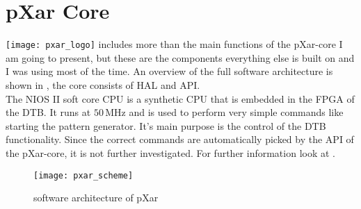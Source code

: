 \section{pXar Core}
\texttt{[image: pxar\_logo]}
includes more than the main functions of the pXar-core I am going to present, but these are the components everything else is built on and I was using most of the time. An overview of the full software architecture is shown in , the core consists of \ac{HAL} and \ac{API}.\\
The NIOS II soft core \ac{CPU} is a synthetic \ac{CPU} that is embedded in the \ac{FPGA} of the \ac{DTB}. It runs at $50\,$MHz and is used to perform very simple commands like starting the pattern generator. It's main purpose is the control of the \ac{DTB} functionality. Since the correct commands are automatically picked by the \ac{API} of the pXar-core, it is not further investigated. For further information look at \cite{spannagel}.
\begin{figure}[ht]
	\texttt{[image: pxar\_scheme]}
	\caption{software architecture of pXar \cite{spannagel}}
	\label{p13}
\end{figure}

